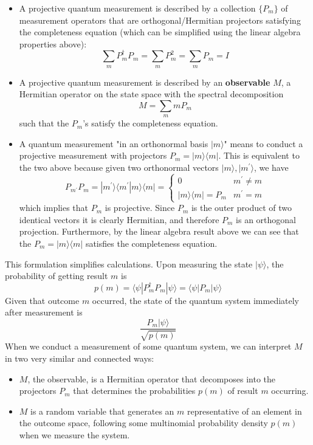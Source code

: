 \documentclass{article}
\theoremstyle{definition}
\begin{document}
\begin{itemize}
  \item A projective quantum measurement is described by a collection $\{P_m\}$ of measurement operators that are orthogonal/Hermitian projectors satisfying the completeness equation (which can be simplified using the linear algebra properties above):
    \[\sum_m P_m^\dagger P_m = \sum_m P_m^2 = \sum_m P_m = I\]
  \item A projective quantum measurement is described by an \textbf{observable} $M$, a Hermitian operator on the state space with the spectral decomposition
    \[M = \sum_m m P_m\]
  such that the $P_m$'s satisfy the completeness equation.
  \item A quantum measurement "in an orthonormal basis $|m\rangle$" means to conduct a projective measurement with projectors $P_m = |m \rangle \langle m |$. This is equivalent to the two above because given two orthonormal vectors $|m\rangle, |m^\prime \rangle$, we have
    \[P_{m^\prime} P_m = |m^\prime \rangle \langle m^\prime | m \rangle \langle m | = \begin{cases} 0 & m^\prime \neq m \\ |m \rangle \langle m | = P_m & m^\prime = m \end{cases}\]
  which implies that $P_m$ is projective. Since $P_m$ is the outer product of two identical vectors it is clearly Hermitian, and therefore $P_m$ is an orthogonal projection. Furthermore, by the linear algebra result above we can see that the $P_m = |m\rangle \langle m|$ satisfies the completeness equation.
\end{itemize}
This formulation simplifies calculations. Upon measuring the state $|\psi\rangle$, the probability of getting result $m$ is
\[p(m) = \langle \psi | P_m^\dagger P_m | \psi \rangle = \langle \psi | P_m | \psi \rangle\]
Given that outcome $m$ occurred, the state of the quantum system immediately after measurement is
\[\frac{P_m |\psi \rangle}{\sqrt{ p(m)}}\]
When we conduct a measurement of some quantum system, we can interpret $M$ in two very similar and connected ways:
\begin{itemize}
  \item $M$, the observable, is a Hermitian operator that decomposes into the projectors $P_m$ that determines the probabilities $p(m)$ of result $m$ occurring.
  \item $M$ is a random variable that generates an $m$ representative of an element in the outcome space, following some multinomial probability density $p(m)$ when we measure the system.
\end{itemize}
\end{document}
